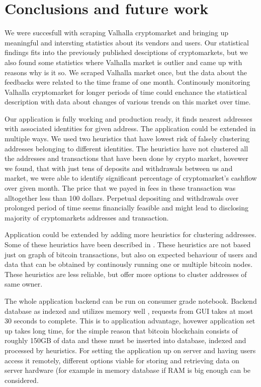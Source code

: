 \documentclass[
  digital, %
  table,   %
  lof,     %
  lot,     %
  oneside
]{fithesis3}
\begin{document}
\chapter{Conclusions and future work}

We were succesfull with scraping Valhalla cryptomarket and
bringing up meaningful and intersting statistics about its vendors and users.
Our statistical findings fits into the previously published desciptions
of cryptomarkets, but we also found some statistics where Valhalla market is outlier and
came up with reasons why is it so.
We scraped Valhalla market once, but the data about the feedbacks were
related to the time frame of one month. Continously monitoring 
Valhalla cryptomarket for longer periods of time could enchance the statistical description
with data about changes of various trends on this market over time.

Our application is fully working and production ready, it 
finds nearest addresses with associated identities for given address.
The application could be extended in multiple ways. We used two
heuristics that have lowest risk of falsely clustering addresses belonging to different identities.
The heuristics have not clustered all the addresses and transactions that have been done by crypto market,
hovewer we found, that with just tens of deposits and withdrawals between us and market,
we were able to identify significant percentage of cryptomarket's cashflow over given month.
The price that we payed in fees in these transaction was alltogether less than 100 dollars. 
Perpetual depositing and withdrawals over prolonged period of time seems financially feasible
and might lead to disclosing majority of cryptomarkets addresses and transaction.

Application could be extended by adding more heuristics for clustering addresses. Some of these
heuristics have been described in \cite{androulaki2013evaluating}.
These heuristics are not based just on graph of bitcoin transactions, but also
on expected behaviour of users and data that can be obtained by continously running one or multiple
bitcoin nodes. These heuristics are less reliable, but offer more options to cluster addresses of same owner.

The whole application backend can be run on consumer grade notebook. Backend database as indexed and utilizes memory well
, requests from GUI takes at most 30 seconds to complete. This is to application advantage,
hovewer application set up takes long time, for the simple reason that bitcoin
blockchain consists of roughly 150GB of data and these must be inserted into database, indexed
and processed by heuristics.
For setting the application up on server and having users access it remotely,
different options viable for storing and retrieving data on server hardware
(for example in memory database if RAM is big enough can be considered.

\end{document}
